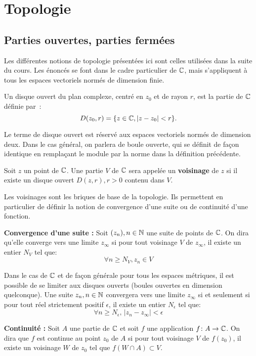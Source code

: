 \section{Topologie}
\subsection{Parties ouvertes, parties fermées}
Les différentes notions de topologie présentées ici sont celles utilisées dans la suite du cours. Les énoncés se font dans le cadre particulier de $\mathbb{C}$, mais s'appliquent à tous les espaces vectoriels normés de dimension finie. 
\begin{fdefn}
	Un disque ouvert du plan complexe, centré en $z_0$ et de rayon $r$, est la partie de $\mathbb{C}$ définie par~:
	\[D(z_0,r) = \{ z \in \mathbb{C} , \lvert z-z_0 \rvert <r\}.\]
\end{fdefn}
\begin{rem}
 Le terme de disque ouvert est réservé aux espaces vectoriels normés de dimension deux. Dans le cas général, on parlera de boule ouverte, qui se définit de façon identique en remplaçant le module par la norme dans la définition précédente.
 \end{rem}
\begin{fdefn}
	Soit $z$ un point de $\mathbb{C}$. Une partie $V$ de $\mathbb{C}$ sera appelée un \textbf{voisinage} de $z$ si il existe un disque ouvert $D(z,r), r > 0$ contenu dans $V$.
\end{fdefn}
Les voisinages sont les briques de base de la topologie. Ils permettent en particulier de définir la notion de convergence d'une suite ou de continuité d'une fonction.
\begin{fdefn}
    \textbf{Convergence d'une suite :}
	Soit $(z_n), n  \in {\mathbb N}$ une suite de points de $\mathbb{C}$. On dira qu'elle converge vers une limite $z_\infty$ si pour tout voisinage $V$ de $z_\infty$, il existe un entier $N_V$ tel que:
	\[
	\forall n \geq N_V, z_n \in V
	\]
\end{fdefn}
Dans le cas de $\mathbb{C}$ et de façon générale pour tous les espaces métriques, il est possible de se limiter aux disques ouverts (boules ouvertes en dimension quelconque). Une suite $z_n, n \in {\mathbb N}$ convergera vers une limite $z_\infty$ si et seulement si pour tout réel strictement positif $\epsilon$, il existe un entier $N_\epsilon$  tel que:
\[
\forall n \geq N_\epsilon, \,|z_n-z_\infty| < \epsilon
\]
\begin{fdefn}
\textbf{Continuité :}
Soit $A$ une partie de $\mathbb{C}$ et soit $f$ une application $f \colon A \to \mathbb{C}$. On dira que $f$ est continue au point $z_0$ de $A$ si pour tout voisinage $V$ de $f(z_0)$, il existe un voisinage $W$ de $z_0$ tel que $f\left(W \cap A\right) \subset V$.
\end{fdefn}
